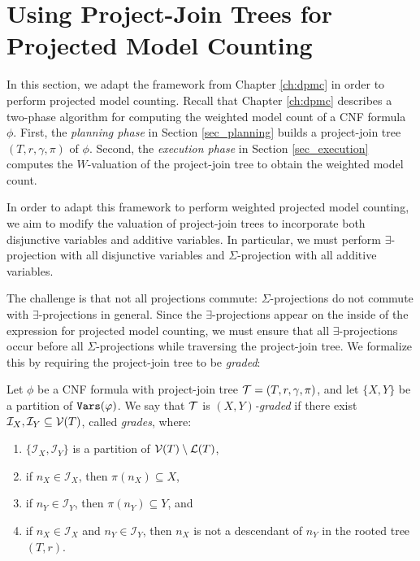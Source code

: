 \section{Using Project-Join Trees for Projected Model Counting}
In this section, we adapt the framework from Chapter \ref{ch:dpmc} in order to perform projected model counting. 
Recall that Chapter \ref{ch:dpmc} describes a two-phase algorithm for computing the weighted model count of a CNF formula $\phi$. First, the \emph{planning phase} in Section \ref{sec_planning} builds a project-join tree $(T, r, \gamma, \pi)$ of $\phi$.
Second, the \emph{execution phase} in Section \ref{sec_execution} computes the $W$-valuation of the project-join tree to obtain the weighted model count.

In order to adapt this framework to perform weighted projected model counting, we aim to modify the valuation of project-join trees to incorporate both disjunctive variables and additive variables. In particular, we must perform $\exists$-projection with all disjunctive variables and $\Sigma$-projection with all additive variables.


The challenge is that not all projections commute: $\Sigma$-projections do not commute with $\exists$-projections in general. Since the $\exists$-projections appear on the inside of the expression for projected model counting, we must ensure that all $\exists$-projections occur before all $\Sigma$-projections while traversing the project-join tree. We formalize this by requiring the project-join tree to be \emph{graded}:
\begin{definition}
\label{def:graded}
    Let $\phi$ be a CNF formula with project-join tree $\mathcal{T} = (T, r, \gamma, \pi)$, and let $\{X, Y\}$ be a partition of $\texttt{\upshape Vars}(\varphi)$.
    We say that $\mathcal{T}$ is \emph{$(X,Y)$-graded} if there exist $\mathcal{I}_X, \mathcal{I}_Y \subseteq \mathcal{V}(T)$, called \emph{grades}, where:
    \begin{enumerate}
        \item $\{\mathcal{I}_X, \mathcal{I}_Y\}$ is a partition of $\mathcal{V}(T) \setminus \mathcal{L}(T)$,
        \item if $n_X \in \mathcal{I}_X$, then $\pi(n_X) \subseteq X$,
        \item if $n_Y \in \mathcal{I}_Y$, then $\pi(n_Y) \subseteq Y$, and
        \item if $n_X \in \mathcal{I}_X$ and $n_Y \in \mathcal{I}_Y$, then $n_X$ is not a descendant of $n_Y$ in the rooted tree $(T, r)$.
    \end{enumerate}
\end{definition}

